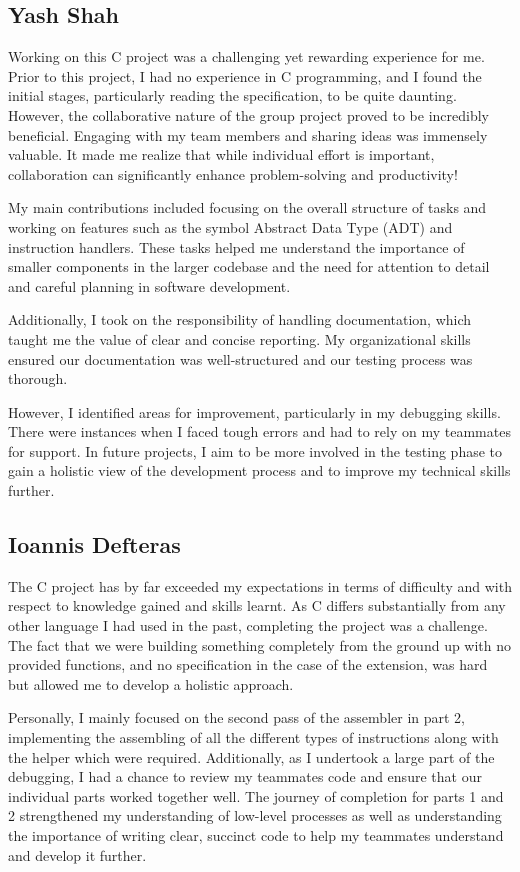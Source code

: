 \documentclass[9pt,a4paper,twoside]{tau-class/tau}
\begin{document}
    \subsection{Yash Shah}
    Working on this C project was a challenging yet rewarding experience for me. Prior to this project, I had no experience in C programming, and I found the initial stages, particularly reading the specification, to be quite daunting. However, the collaborative nature of the group project proved to be incredibly beneficial. Engaging with my team members and sharing ideas was immensely valuable. It made me realize that while individual effort is important, collaboration can significantly enhance problem-solving and productivity!  
    
    My main contributions included focusing on the overall structure of tasks and working on features such as the symbol Abstract Data Type (ADT) and instruction handlers. These tasks helped me understand the importance of smaller components in the larger codebase and the need for attention to detail and careful planning in software development.  
    
    Additionally, I took on the responsibility of handling documentation, which taught me the value of clear and concise reporting. My organizational skills ensured our documentation was well-structured and our testing process was thorough.      
    
    However, I identified areas for improvement, particularly in my debugging skills. There were instances when I faced tough errors and had to rely on my teammates for support. In future projects, I aim to be more involved in the testing phase to gain a holistic view of the development process and to improve my technical skills further.    
    
    \subsection{Ioannis Defteras}
    
    The C project has by far exceeded my expectations in terms of difficulty and with respect to knowledge gained and skills learnt.  As C differs substantially from any other language I had used in the past, completing the project was a challenge. The fact that we were building something completely from the ground up with no provided functions, and no specification in the case of the extension, was hard but allowed me to develop a holistic approach. 
    
    Personally, I mainly focused on the second pass of the assembler in part 2, implementing the assembling of all the different types of instructions along with the helper which were required. Additionally, as I undertook a large part of the debugging, I had a chance to review my teammates code and ensure that our individual parts worked together well. The journey of completion for parts 1 and 2 strengthened my understanding of low-level processes as well as understanding the importance of writing clear, succinct code to help my teammates understand and develop it further. 
    
\end{document}
